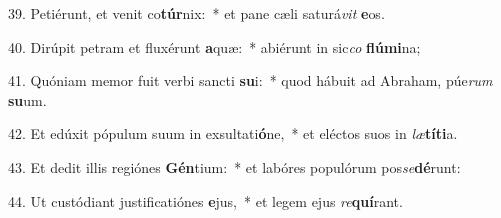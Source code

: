 39. Petiérunt, et venit co\textbf{túr}nix:~*  et pane cæli saturá\textit{vit} \textbf{e}os.\

40. Dirúpit petram et fluxérunt \textbf{a}quæ:~*  abiérunt in sic\textit{co} \textbf{flú}\textbf{mi}na;\

41. Quóniam memor fuit verbi sancti \textbf{su}i:~*  quod hábuit ad Abraham, púe\textit{rum} \textbf{su}um.\

42. Et edúxit pópulum suum in exsultati\textbf{ó}ne,~*  et eléctos suos in \textit{læ}\textbf{tí}\textbf{ti}a.\

43. Et dedit illis regiónes \textbf{Gén}tium:~*  et labóres populórum pos\textit{se}\textbf{dé}runt:\

44. Ut custódiant justificatiónes \textbf{e}jus,~*  et legem ejus \textit{re}\textbf{quí}rant.\

